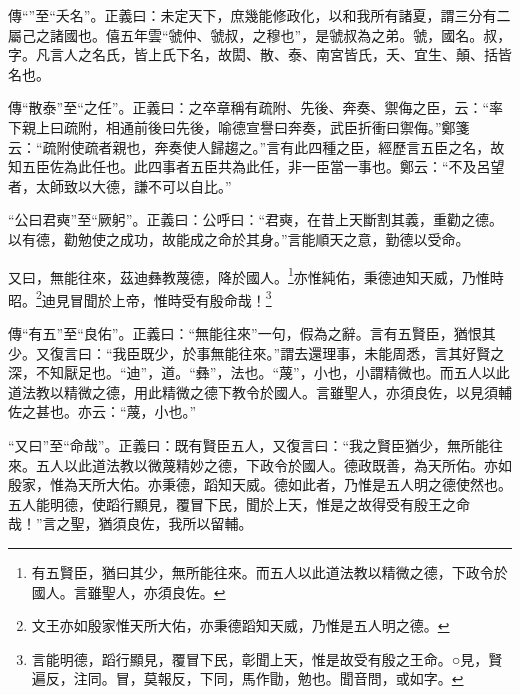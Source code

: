 {\noindent\zhuan{}\fzbyks 傳“”至“夭名”。正義曰：未定天下，庶幾能修政化，以和我所有諸夏，謂三分有二屬己之諸國也。僖五年雲“虢仲、虢叔，之穆也”，是虢叔為之弟。虢，國名。叔，字。凡言人之名氏，皆上氏下名，故閎、散、泰、南宮皆氏，夭、宜生、顛、括皆名也。 \par}

{\noindent\zhuan{}\fzbyks 傳“散泰”至“之任”。正義曰：之卒章稱有疏附、先後、奔奏、禦侮之臣，云：“率下親上曰疏附，相通前後曰先後，喻德宣譽曰奔奏，武臣折衝曰禦侮。”鄭箋云：“疏附使疏者親也，奔奏使人歸趨之。”言有此四種之臣，經歷言五臣之名，故知五臣佐為此任也。此四事者五臣共為此任，非一臣當一事也。鄭云：“不及呂望者，太師致以大德，謙不可以自比。” \par}

{\noindent\shu{}\fzkt “公曰君奭”至“厥躬”。正義曰：公呼曰：“君奭，在昔上天斷割其義，重勸之德。以有德，勸勉使之成功，故能成之命於其身。”言能順天之意，勤德以受命。 \par}

又曰，無能往來，茲迪彝教蔑德，降於國人。\footnote{有五賢臣，猶曰其少，無所能往來。而五人以此道法教以精微之德，下政令於國人。言雖聖人，亦須良佐。}亦惟純佑，秉德迪知天威，乃惟時昭。\footnote{文王亦如殷家惟天所大佑，亦秉德蹈知天威，乃惟是五人明之德。}迪見冒聞於上帝，惟時受有殷命哉！\footnote{言能明德，蹈行顯見，覆冒下民，彰聞上天，惟是故受有殷之王命。○見，賢遍反，注同。冒，莫報反，下同，馬作勖，勉也。聞音問，或如字。}


{\noindent\zhuan{}\fzbyks 傳“有五”至“良佑”。正義曰：“無能往來”一句，假為之辭。言有五賢臣，猶恨其少。又復言曰：“我臣既少，於事無能往來。”謂去還理事，未能周悉，言其好賢之深，不知厭足也。“迪”，道。“彝”，法也。“蔑”，小也，小謂精微也。而五人以此道法教以精微之德，用此精微之德下教令於國人。言雖聖人，亦須良佐，以見須輔佐之甚也。亦云：“蔑，小也。” \par}

{\noindent\shu{}\fzkt “又曰”至“命哉”。正義曰：既有賢臣五人，又復言曰：“我之賢臣猶少，無所能往來。五人以此道法教以微蔑精妙之德，下政令於國人。德政既善，為天所佑。亦如殷家，惟為天所大佑。亦秉德，蹈知天威。德如此者，乃惟是五人明之德使然也。五人能明德，使蹈行顯見，覆冒下民，聞於上天，惟是之故得受有殷王之命哉！”言之聖，猶須良佐，我所以留輔。 \par}

